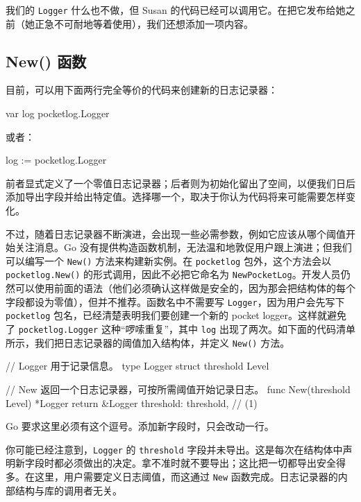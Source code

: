 我们的 \texttt{Logger} 什么也不做，但 Susan 的代码已经可以调用它。在把它发布给她之前（她正急不可耐地等着使用），我们还想添加一项内容。

\subsection{New() 函数}

目前，可以用下面两行完全等价的代码来创建新的日志记录器：

\begin{gocode}[]
var log pocketlog.Logger
\end{gocode}

或者：

\begin{gocode}[]
log := pocketlog.Logger{}
\end{gocode}

前者显式定义了一个零值日志记录器；后者则为初始化留出了空间，以便我们日后添加导出字段并给出特定值。选择哪一个，取决于你认为代码将来可能需要怎样变化。

不过，随着日志记录器不断演进，会出现一些必需参数，例如它应该从哪个阈值开始关注消息。Go 没有提供构造函数机制，无法温和地敦促用户跟上演进；但我们可以编写一个 \texttt{New()} 方法来构建新实例。在 \texttt{pocketlog} 包外，这个方法会以 \texttt{pocketlog.New()} 的形式调用，因此不必把它命名为 \texttt{NewPocketLog}。开发人员仍然可以使用前面的语法（他们必须确认这样做是安全的，因为那会把结构体的每个字段都设为零值），但并不推荐。函数名中不需要写 \texttt{Logger}，因为用户会先写下 \texttt{pocketlog} 包名，已经清楚表明我们要创建一个新的 pocket logger。这样就避免了 \texttt{pocketlog.Logger} 这种“啰嗦重复”，其中 \texttt{log} 出现了两次。如下面的代码清单所示，我们把日志记录器的阈值加入结构体，并定义 \texttt{New()} 方法。

\begin{gocode}[title={代码清单 4.3 logger.go：定义新对象}]
// Logger 用于记录信息。
type Logger struct {
    threshold Level
}

// New 返回一个日志记录器，可按所需阈值开始记录日志。
func New(threshold Level) *Logger {
    return &Logger{
        threshold: threshold, // (1)
    }
}
\end{gocode}

\begin{codeannotations}
  \item Go 要求这里必须有这个逗号。添加新字段时，只会改动一行。
\end{codeannotations}

你可能已经注意到，\texttt{Logger} 的 \texttt{threshold} 字段并未导出。这是每次在结构体中声明新字段时都必须做出的决定。拿不准时就不要导出；这比把一切都导出安全得多。在这里，用户需要定义日志阈值，而这通过 \texttt{New} 函数完成。日志记录器的内部结构与库的调用者无关。

